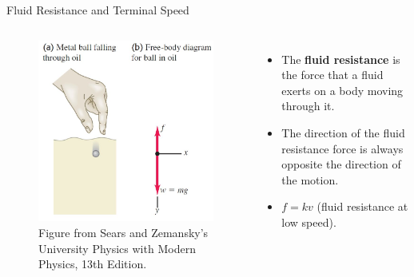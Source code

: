 \documentclass[]{beamer}
\begin{document}
      




\begin{frame}
  Fluid Resistance and Terminal Speed
 \vspace{3mm}



 \begin{columns}[c]
  \column{2in}  %
 

  \begin{figure}[h!]  
    \includegraphics[width=1.\textwidth]{images/f24.jpg}
    \caption{ {\tiny Figure from Sears and Zemansky's University Physics 
    with Modern Physics, 13th Edition.} }
  \end{figure}

  \column{2in}

\begin{itemize}
  \item The \textbf{fluid resistance} is the force that a fluid exerts on a
  body moving through it.
  \pause
  \item The direction of the fluid resistance force is always opposite
  the direction of the motion.
  \pause
  \item $f=kv$ (fluid resistance at low speed).
\end{itemize}



  \end{columns}


   \end{frame}
\end{document}
